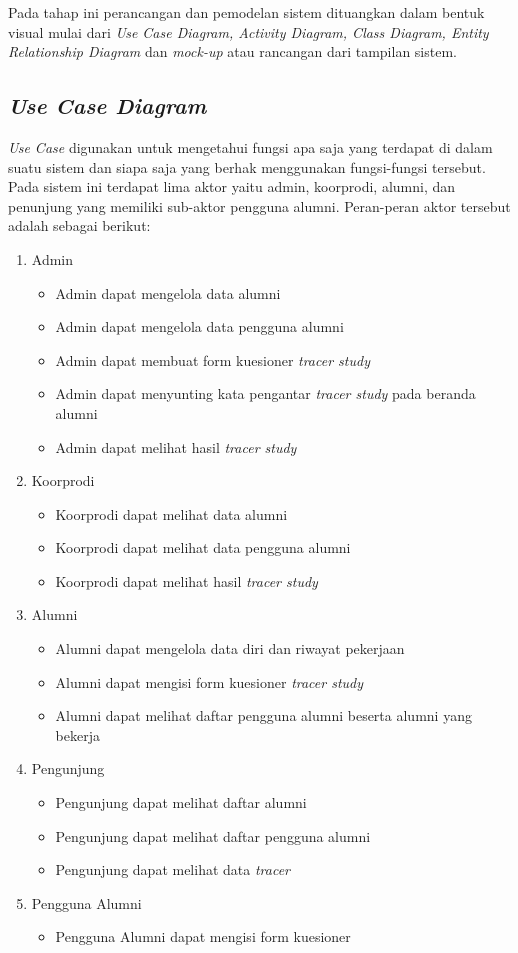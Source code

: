 Pada tahap ini perancangan dan pemodelan sistem dituangkan dalam bentuk visual mulai dari \textit{Use Case Diagram, Activity Diagram, Class Diagram, Entity Relationship Diagram} dan \textit{mock-up} atau rancangan dari tampilan sistem. 

\subsection{\emph{Use Case Diagram}}
\textit{Use Case} digunakan untuk mengetahui fungsi apa saja yang terdapat di dalam suatu sistem dan siapa saja yang berhak menggunakan fungsi-fungsi tersebut. Pada sistem ini terdapat lima aktor yaitu admin, koorprodi, alumni, dan penunjung yang memiliki sub-aktor pengguna alumni. Peran-peran aktor tersebut adalah sebagai berikut:
\begin{enumerate}
	\item Admin
	\begin{itemize}
		\item Admin dapat mengelola data alumni
		\item Admin dapat mengelola data pengguna alumni
		\item Admin dapat membuat form kuesioner \textit{tracer study}
		\item Admin dapat menyunting kata pengantar \textit{tracer study} pada beranda alumni 
		\item Admin dapat melihat hasil \textit{tracer study} 
	\end{itemize}
	\item Koorprodi 
	\begin{itemize}
		\item Koorprodi dapat melihat data alumni
		\item Koorprodi dapat melihat data pengguna alumni
		\item Koorprodi dapat melihat hasil \textit{tracer study}
	\end{itemize}
	\item Alumni
	\begin{itemize}
		\item Alumni dapat mengelola data diri dan riwayat pekerjaan
		\item Alumni dapat mengisi form kuesioner \textit{tracer study}
		\item Alumni dapat melihat daftar pengguna alumni beserta alumni yang bekerja
	\end{itemize}
	\item Pengunjung
	\begin{itemize}
		\item Pengunjung dapat melihat daftar alumni
		\item Pengunjung dapat melihat daftar pengguna alumni
		\item Pengunjung dapat melihat data \textit{tracer}
	\end{itemize}
	\item Pengguna Alumni
	\begin{itemize}
		\item Pengguna Alumni dapat mengisi form kuesioner
	\end{itemize}
\end{enumerate}

